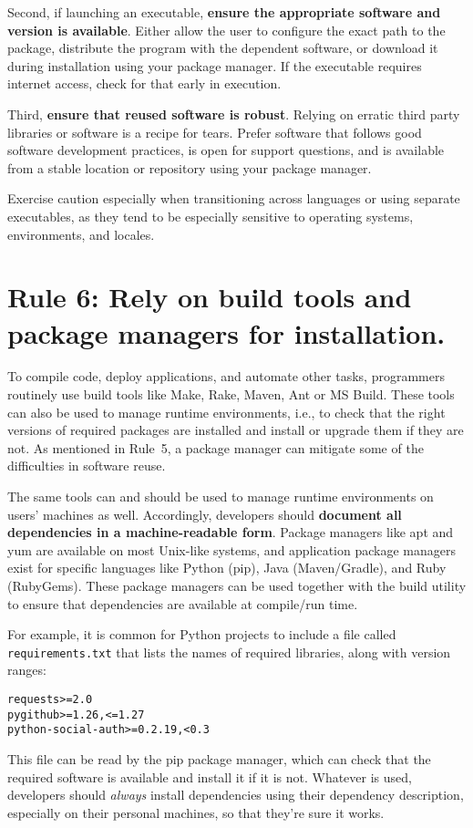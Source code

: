 \documentclass[10pt,letterpaper]{article}
\newcommand{\rulemajor}[1]{\section*{#1}}
\newcommand{\ruleminor}[1]{\textbf{#1}}
\begin{document}
Second, if launching an executable, \ruleminor{ensure the appropriate
software and version is available}.  Either allow the user to
configure the exact path to the package, distribute the program with
the dependent software, or download it during installation using your
package manager. If the executable requires internet access, check for
that early in execution.

Third, \ruleminor{ensure that reused software is robust}. Relying on
erratic third party libraries or software is a recipe for
tears. Prefer software that follows good software development
practices, is open for support questions, and is available from a
stable location or repository using your package manager.

Exercise caution especially when transitioning across languages or
using separate executables, as they tend to be especially sensitive to
operating systems, environments, and locales.

\rulemajor{Rule 6: Rely on build tools and package managers for installation.}

To compile code, deploy applications, and automate other tasks,
programmers routinely use build tools like Make, Rake, Maven, Ant or
MS Build.  These tools can also be used to manage runtime
environments, i.e., to check that the right versions of required
packages are installed and install or upgrade them if they are not.
As mentioned in Rule~5, a package manager can mitigate some of the
difficulties in software reuse.

The same tools can and should be used to manage runtime environments
on users' machines as well.  Accordingly, developers should
\ruleminor{document all dependencies in a machine-readable form}.
Package managers like apt and yum are available on most Unix-like
systems, and application package managers exist for specific languages
like Python (pip), Java (Maven/Gradle), and Ruby (RubyGems). These
package managers can be used together with the build utility to ensure
that dependencies are available at compile/run time.

For example, it is common for Python projects to include a file called
\texttt{requirements.txt} that lists the names of required libraries,
along with version ranges:

\begin{verbatim}
requests>=2.0
pygithub>=1.26,<=1.27
python-social-auth>=0.2.19,<0.3
\end{verbatim}

This file can be read by the pip package manager, which can check that
the required software is available and install it if it is not.
Whatever is used, developers should \emph{always} install dependencies
using their dependency description, especially on their personal
machines, so that they're sure it works.
\end{document}
